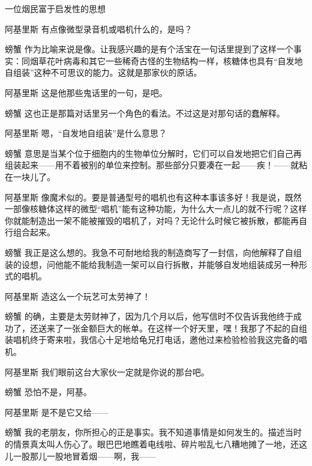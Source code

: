 \begin{dialog}{一位烟民富于启发性的思想}
\begin{dialogue}
\item[阿基里斯]有点像微型录音机或唱机什么的，是吗？

\item[螃蟹]作为比喻来说是像。让我感兴趣的是有个活宝在一句话里提到了这样一个事实：同烟草花叶病毒和其它一些稀奇古怪的生物结构一样，核糖体也具有“自发地自组装”这种不可思议的能力。这就是那家伙的原话。

\item[阿基里斯]这是他那些鬼话里的一句，是吧。

\item[螃蟹]这也正是那篇对话里另一个角色的看法。不过这是对那句话的蠢解释。


\item[阿基里斯]嗯，“自发地自组装”是什么意思？

\item[螃蟹]意思是当某个位于细胞内的生物单位分解时，它们可以自发地把它们自己再组装起来——用不着被别的单位来控制。那些部分只要凑在一起——疾！——就粘在一块儿了。

\item[阿基里斯]像魔术似的。要是普通型号的唱机也有这种本事该多好！我是说，既然一部像核糖体这样的微型“唱机”能有这种功能，为什么大一点儿的就不行呢？这样你就能制造出一架不能被摧毁的唱机了，对吗？无论什么时候它被拆散，都能再自行组合起来。

\item[螃蟹]我正是这么想的。我急不可耐地给我的制造商写了一封信，向他解释了自组装的设想，问他能不能给我制造一架可以自行拆散，并能够自发地组装成另一种形式的唱机。

\item[阿基里斯]造这么一个玩艺可太劳神了！

\item[螃蟹]的确，主要是太劳财神了，因为几个月以后，他写信时不仅告诉我他终于成功了，还送来了一张金额巨大的帐单。在这样一个好天里，嘿！我那了不起的自组装唱机终于寄来啦，我信心十足地给龟兄打电话，邀他过来检验检验我这完备的唱机。

\item[阿基里斯]我们眼前这台大家伙一定就是你说的那台吧。

\item[螃蟹]恐怕不是，阿基。

\item[阿基里斯]是不是它又给——

\item[螃蟹]我的老朋友，你所担心的正是事实。我不知道事情是如何发生的。描述当时的情景真太叫人伤心了。眼巴巴地瞧着电线啦、碎片啦乱七八糟地摊了一地，还这儿一股那儿一股地冒着烟——啊，我——


\end{dialogue}
\end{dialog}
